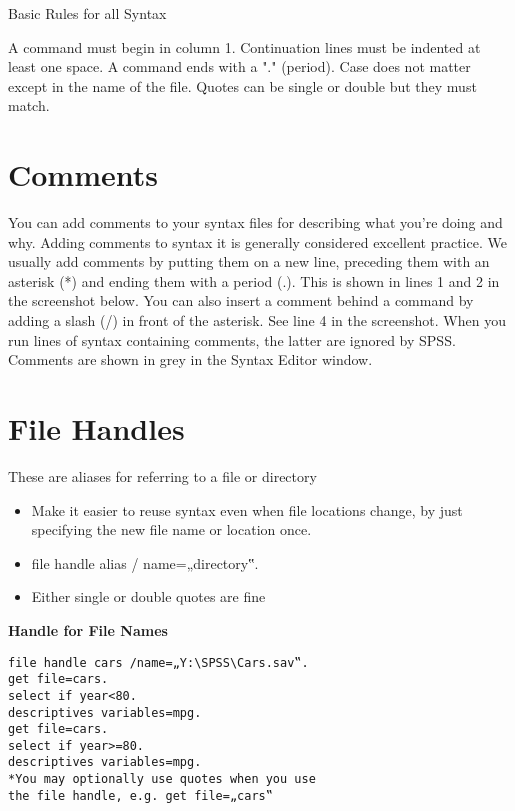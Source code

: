 Basic Rules for all Syntax

A command must begin in column 1.
Continuation lines must be indented at least one space.
A command ends with a "." (period).
Case does not matter except in the name of the file.
Quotes can be single or double but they must match.

\section{Comments}
You can add comments to your syntax files for describing what you're doing and why. Adding comments to syntax it is generally considered excellent practice.
We usually add comments by putting them on a new line, preceding them with an asterisk (*) and ending them with a period (.). This is shown in lines 1 and 2 in the screenshot below.
You can also insert a comment behind a command by adding a slash (/) in front of the asterisk. See line 4 in the screenshot.
When you run lines of syntax containing comments, the latter are ignored by SPSS. Comments are shown in grey in the Syntax Editor window.

\section{File Handles}
These are aliases for referring to a file or directory

\begin{itemize}
\item Make it easier to reuse syntax even when file
locations change, by just specifying the new file
name or location once.

\item file handle alias / name=„directory\filename‟.

\item Either single or double quotes are fine

\end{itemize}

\textbf{Handle for File Names}
\begin{framed}
\begin{verbatim}
file handle cars /name=„Y:\SPSS\Cars.sav‟.
get file=cars.
select if year<80.
descriptives variables=mpg.
get file=cars.
select if year>=80.
descriptives variables=mpg.
*You may optionally use quotes when you use
the file handle, e.g. get file=„cars‟
\end{verbatim}
\end{framed}

